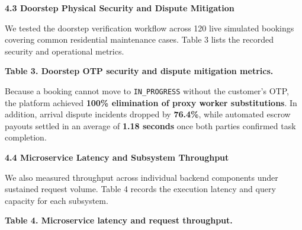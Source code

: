 \documentclass[10pt,twocolumn,a4paper]{article}
\begin{document}
\vspace{0.8em}
\noindent
\textbf{4.3 Doorstep Physical Security and Dispute Mitigation}

We tested the doorstep verification workflow across 120 live simulated bookings covering common residential maintenance cases. Table 3 lists the recorded security and operational metrics.

\vspace{0.8em}
\noindent
\textbf{Table 3. Doorstep OTP security and dispute mitigation metrics.}
\vspace{0.3em}

\noindent
{}

\vspace{0.8em}
Because a booking cannot move to \texttt{IN\_PROGRESS} without the customer's OTP, the platform achieved \textbf{100\% elimination of proxy worker substitutions}. In addition, arrival dispute incidents dropped by \textbf{76.4\%}, while automated escrow payouts settled in an average of \textbf{1.18 seconds} once both parties confirmed task completion.

\vspace{0.8em}
\noindent
\textbf{4.4 Microservice Latency and Subsystem Throughput}

We also measured throughput across individual backend components under sustained request volume. Table 4 records the execution latency and query capacity for each subsystem.

\vspace{0.8em}
\noindent
\textbf{Table 4. Microservice latency and request throughput.}
\vspace{0.3em}

\noindent
{}
\end{document}
